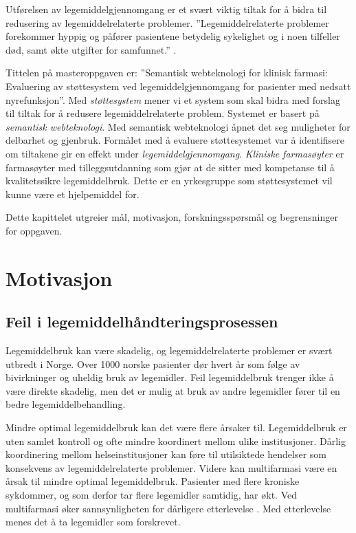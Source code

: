 Utførelsen av legemiddelgjennomgang er et svært viktig tiltak for å bidra til redusering av legemiddelrelaterte problemer. ''Legemiddelrelaterte problemer forekommer hyppig og påfører pasientene betydelig sykelighet og i noen tilfeller død, samt økte utgifter for samfunnet.'' \citep{norske_legeforening}. 

Tittelen på masteroppgaven er: ''Semantisk webteknologi for klinisk farmasi: Evaluering av støttesystem ved legemiddelgjennomgang for pasienter med nedsatt nyrefunksjon''. Med \textit{støttesystem} mener vi et system som skal bidra med forslag til tiltak for å redusere legemiddelrelaterte problem. Systemet er basert på \textit{semantisk webteknologi}. Med semantisk webteknologi åpnet det seg muligheter for delbarhet og gjenbruk. Formålet med å evaluere støttesystemet var å identifisere om tiltakene gir en effekt under \textit{legemiddelgjennomgang}. \textit{Kliniske farmasøyter} er farmasøyter med tilleggsutdanning som gjør at de sitter med kompetanse til å kvalitetssikre legemiddelbruk. Dette er en yrkesgruppe som støttesystemet vil kunne være et hjelpemiddel for.


Dette kapittelet utgreier mål, motivasjon, forskningsspørsmål og begrensninger for oppgaven.

\section{Motivasjon}
\subsection{Feil i legemiddelhåndteringsprosessen}
Legemiddelbruk kan være skadelig, og legemiddelrelaterte problemer er svært utbredt i Norge. Over 1000 norske pasienter dør hvert år som følge av bivirkninger og uheldig bruk av legemidler\citep{apotekforeningen_fakta_om_legemiddelbruk}. Feil legemiddelbruk trenger ikke å være direkte skadelig, men det er mulig at bruk av andre legemidler fører til en bedre legemiddelbehandling.  

Mindre optimal legemiddelbruk kan det være flere årsaker til. Legemiddelbruk er uten samlet kontroll og ofte mindre koordinert mellom ulike institusjoner. Dårlig koordinering mellom helseinstitusjoner kan føre til utilsiktede hendelser som konsekvens av legemiddelrelaterte problemer. Videre kan multifarmasi være en årsak til mindre optimal legemiddelbruk. Pasienter med flere kroniske sykdommer, og som derfor tar flere legemidler samtidig, har økt\citep{Uijen_Lisdonk}. Ved multifarmasi øker sannsynligheten for dårligere etterlevelse \citep{Ulfvarson}. Med etterlevelse menes det å ta legemidler som forskrevet.

